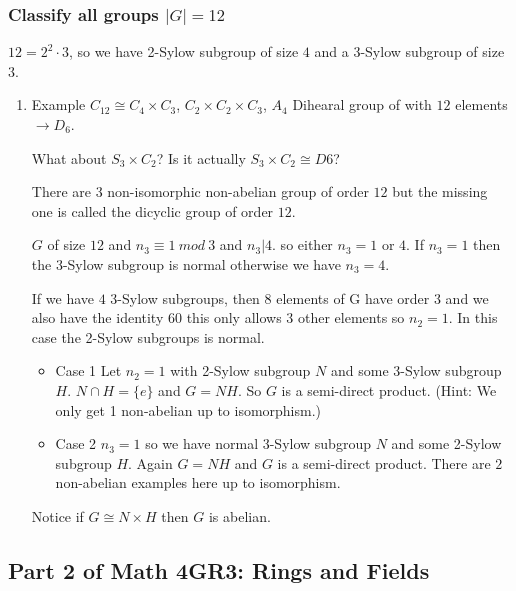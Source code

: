 \documentclass[11pt]{article}
\begin{document}
\subsubsection{Classify all groups \(|G| = 12\)}
\label{sec:org23aa595}
\(12 = 2^2 \cdot 3\), so we have 2-Sylow subgroup of size \(4\) and a 3-Sylow
subgroup of size \(3\).
\begin{enumerate}
\item Example
\label{sec:orgbd7fa42}
\(C_12 \cong C_4 \times C_3\), \(C_2 \times C_2 \times C_3\),
\(A_4\)
Dihearal group of with \(12\) elements \(\to D_6\).

What about \(S_3 \times C_2\)? Is it actually \(S_3 \times C_2 \cong D6\)?

There are \(3\) non-isomorphic non-abelian group of order \(12\)
but the missing one is called the dicyclic group of order \(12\).

\(G\) of size \(12\) and \(n_3 \equiv 1\ mod\ 3\) and \(n_3 | 4\).
so either \(n_3 = 1\) or \(4\). If \(n_3 = 1\) then the 3-Sylow subgroup is
normal otherwise we have \(n_3 = 4\).

If we have \(4\) 3-Sylow subgroups, then \(8\) elements of G have order \(3\)
and we also have the identity \(60\) this only allows \(3\) other elements so
\(n_2 = 1\). In this case the 2-Sylow subgroups is normal.

\begin{itemize}
\item Case 1
Let \(n_2 = 1\) with 2-Sylow subgroup \(N\) and some 3-Sylow subgroup \(H\).
\(N \cap H = \{e\}\) and \(G = NH\). So \(G\) is a semi-direct product. (Hint: We
only get 1 non-abelian up to isomorphism.)

\item Case 2
\(n_3 = 1\) so we have normal 3-Sylow subgroup \(N\) and some 2-Sylow
subgroup \(H\). Again \(G = NH\) and \(G\) is a semi-direct product. There are \(2\)
non-abelian examples here up to isomorphism.
\end{itemize}

Notice if \(G \cong N \times H\) then \(G\) is abelian.
\end{enumerate}

\subsection{Part 2 of Math 4GR3: Rings and Fields}
\label{sec:org9cce1d2}
\end{document}
